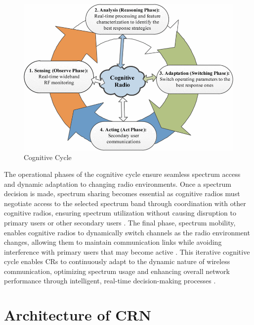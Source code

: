 \begin{figure}
    \centering
    \includegraphics[width=0.8\linewidth]{Figures/chapter1/cr_cycle.png}
    \caption{Cognitive Cycle \cite{ref29}}
    \label{fig:cr_cycle}
\end{figure}

The operational phases of the cognitive cycle ensure seamless spectrum access and dynamic adaptation to changing radio environments. Once a spectrum decision is made, spectrum sharing becomes essential as cognitive radios must negotiate access to the selected spectrum band through coordination with other cognitive radios, ensuring spectrum utilization without causing disruption to primary users or other secondary users \cite{ref1,ref3}. The final phase, spectrum mobility, enables cognitive radios to dynamically switch channels as the radio environment changes, allowing them to maintain communication links while avoiding interference with primary users that may become active \cite{ref1,ref3}. This iterative cognitive cycle enables CRs to continuously adapt to the dynamic nature of wireless communication, optimizing spectrum usage and enhancing overall network performance through intelligent, real-time decision-making processes \cite{ref1,ref3}.

\section{\textbf{Architecture of CRN}}

